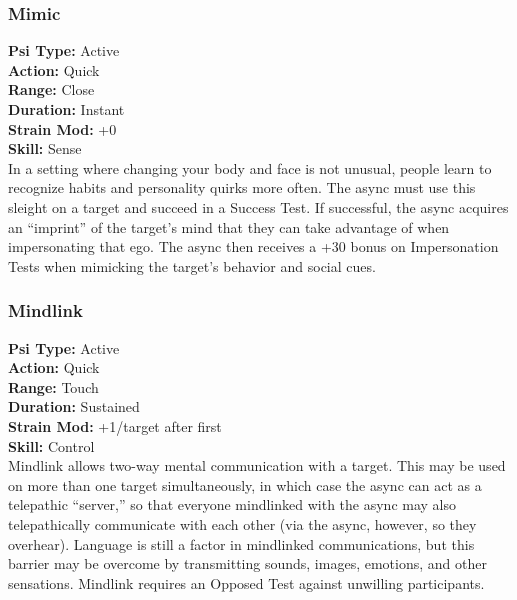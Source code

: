 \subsubsection{Mimic}
\textbf{Psi Type:} Active \\ 
\textbf{Action:} Quick \\ 
\textbf{Range:} Close \\ 
\textbf{Duration:} Instant \\
\textbf{Strain Mod:} +0 \\ 
\textbf{Skill:} Sense\\
In a setting where changing your body and face is
not unusual, people learn to recognize habits and
personality quirks more often. The async must use
this sleight on a target and succeed in a Success Test.
If successful, the async acquires an “imprint” of the
target’s mind that they can take advantage of when
impersonating that ego. The async then receives a +30
bonus on Impersonation Tests when mimicking the
target’s behavior and social cues.

\subsubsection{Mindlink}
\textbf{Psi Type:} Active \\ 
\textbf{Action:} Quick \\ 
\textbf{Range:} Touch \\ 
\textbf{Duration:} Sustained \\
\textbf{Strain Mod:} +1/target after first \\ 
\textbf{Skill:} Control\\
Mindlink allows two-way mental communication
with a target. This may be used on more than one
target simultaneously, in which case the async can act
as a telepathic “server,” so that everyone mindlinked
with the async may also telepathically communicate
with each other (via the async, however, so they
overhear). Language is still a factor in mindlinked
communications, but this barrier may be overcome by
transmitting sounds, images, emotions, and other sensations.
Mindlink requires an Opposed Test against
unwilling participants.

